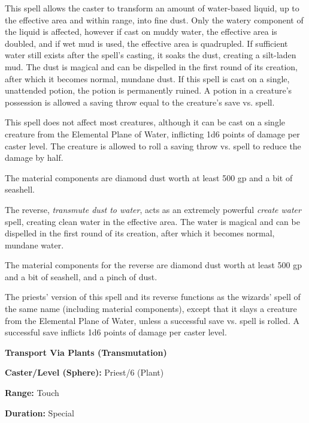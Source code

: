 \begin{multicols}{2}
This spell allows the caster to transform an amount of water-based liquid, up to the effective area and within range, into fine dust.  Only the watery component of the liquid is affected, however if cast on muddy water, the effective area is doubled, and if wet mud is used, the effective area is quadrupled.  If sufficient water still exists after the spell's casting, it soaks the dust, creating a silt-laden mud.  The dust is magical and can be dispelled in the first round of its creation, after which it becomes normal, mundane dust.  If this spell is cast on a single, unattended potion, the potion is permanently ruined.  A potion in a creature's possession is allowed a saving throw equal to the creature's save vs. spell.  

This spell does not affect most creatures, although it can be cast on a single creature from the Elemental Plane of Water, inflicting 1d6 points of damage per caster level.  The creature is allowed to roll a saving throw vs. spell to reduce the damage by half. 

The material components are diamond dust worth at least 500 gp and a bit of seashell.

The reverse, \textit{transmute dust to water}, acts as an extremely powerful \textit{create water} spell, creating clean water in the effective area.  The water is magical and can be dispelled in the first round of its creation, after which it becomes normal, mundane water.

The material components for the reverse are diamond dust worth at least 500 gp and a bit of seashell, and a pinch of dust.

The priests' version of this spell and its reverse functions as the wizards' spell of the same name (including material components), except that it slays a creature from the Elemental Plane of Water, unless a successful save vs. spell is rolled.  A successful save inflicts 1d6 points of damage per caster level.

\vspace{1em}

\noindent
\begin{minipage}{\columnwidth}

\noindent \textbf{Transport Via Plants (Transmutation)}

\noindent \textbf{Caster/Level (Sphere):} Priest/6 (Plant)

\noindent \textbf{Range:} Touch

\noindent \textbf{Duration:} Special


\end{minipage}
\end{multicols}
